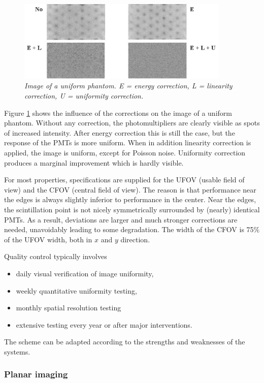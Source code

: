 \documentclass[11pt,oneside]{article}
\begin{document}
\begin{figure}[tb]
\centering
\includegraphics[width=0.9\textwidth]{figs/fig_en_lin_unif.pdf}
\caption{\label{fig:en_lin_unif} \emph{Image of a uniform phantom. E = energy
correction, L = linearity correction, U = uniformity correction.}}
\end{figure}
%
Figure \ref{fig:en_lin_unif} shows the influence of the corrections on the
image of a uniform phantom. Without any correction, the photomultipliers are
clearly visible as spots of increased intensity. After energy correction this
is still the case, but the response of the PMTs is more uniform. When in
addition linearity correction is applied, the image is uniform, except for
Poisson noise. Uniformity correction produces a marginal improvement which is
hardly visible.

For most properties, specifications are supplied for the UFOV (usable field of
view) and the CFOV (central field of view). The reason is that performance
near the edges is always slightly inferior to performance in the center. Near
the edges, the scintillation point is not nicely symmetrically surrounded by
(nearly) identical PMTs. As a result, deviations are larger and much stronger
corrections are needed, unavoidably leading to some degradation. The width of
the CFOV is 75\% of the UFOV width, both in $x$ and $y$ direction. 

Quality control typically involves
\begin{itemize}
  \item daily visual verification of image uniformity,
  \item weekly quantitative uniformity testing,
  \item monthly spatial resolution testing
  \item extensive testing every year or after major interventions.
\end{itemize}
The scheme can be adapted according to the strengths and weaknesses of the
systems.


\subsubsection{Planar imaging}
\end{document}

